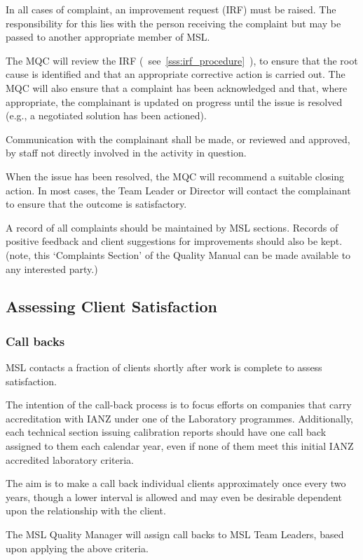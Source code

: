 In all cases of complaint, an improvement request (IRF) must be raised. The responsibility for this lies with the person receiving the complaint but may be passed to another appropriate member of MSL.

The MQC will review the IRF (~see~\ref{sss:irf_procedure}~), to ensure that the root cause is identified and that an appropriate corrective action is carried out.  
The MQC will also ensure that a complaint has been acknowledged and that, where appropriate, the complainant is updated on progress until the issue is resolved (e.g., a negotiated solution has been actioned). 

Communication with the complainant shall be made, or reviewed and approved, by staff not directly involved in the activity in question.

When the issue has been resolved, the MQC will recommend a suitable closing action. In most cases, the Team Leader or Director will contact the complainant to ensure that the outcome is satisfactory. 

A record of all complaints should be maintained by MSL sections. Records of positive feedback and client suggestions for improvements should also be kept.
(note, this `Complaints Section' of the Quality Manual can be made available to any interested party.)

\subsection{Assessing Client Satisfaction}
\label{ss:client_satisfaction}
\subsubsection{Call backs}
MSL contacts a fraction of clients shortly after work is complete to assess satisfaction.

The intention of the call-back process is to focus efforts on companies that carry accreditation with IANZ under one of the Laboratory programmes.  Additionally, each technical section issuing calibration reports should have one call back assigned to them each calendar year, even if none of them meet this initial IANZ accredited laboratory criteria.

The aim is to make a call back individual clients approximately once every two years, though a lower interval is allowed and may even be desirable dependent upon the relationship with the client.

The MSL Quality Manager will assign call backs to MSL Team Leaders, based upon applying the above criteria.

